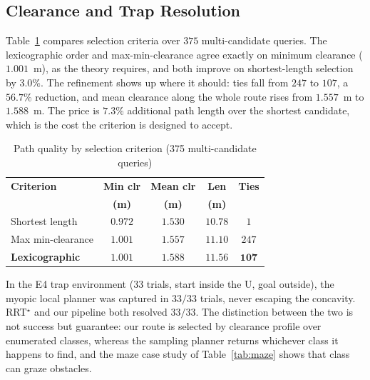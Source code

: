 \documentclass[conference]{IEEEtran}
\begin{document}
\subsection{Clearance and Trap Resolution}
Table~\ref{tab:clearance} compares selection criteria over $375$ multi-candidate queries. The lexicographic order and max-min-clearance agree exactly on minimum clearance ($1.001$~m), as the theory requires, and both improve on shortest-length selection by $3.0\%$. The refinement shows up where it should: ties fall from $247$ to $107$, a $56.7\%$ reduction, and mean clearance along the whole route rises from $1.557$~m to $1.588$~m. The price is $7.3\%$ additional path length over the shortest candidate, which is the cost the criterion is designed to accept.
\begin{table}[htbp]
\caption{Path quality by selection criterion (375 multi-candidate queries)}
\label{tab:clearance}
\begin{center}
\begin{tabular}{@{}lcccc@{}}
\toprule
\textbf{Criterion} & \textbf{Min clr} & \textbf{Mean clr} & \textbf{Len} & \textbf{Ties} \\
 & \textbf{(m)} & \textbf{(m)} & \textbf{(m)} & \\ \midrule
Shortest length & $0.972$ & $1.530$ & $\mathbf{10.78}$ & $1$ \\
Max min-clearance & $\mathbf{1.001}$ & $1.557$ & $11.10$ & $247$ \\
\textbf{Lexicographic} & $\mathbf{1.001}$ & $\mathbf{1.588}$ & $11.56$ & $\mathbf{107}$ \\ \bottomrule
\end{tabular}
\end{center}
\end{table}
In the E4 trap environment ($33$ trials, start inside the U, goal outside), the myopic local planner was captured in $33/33$ trials, never escaping the concavity. RRT$^\star$ and our pipeline both resolved $33/33$. The distinction between the two is not success but guarantee: our route is selected by clearance profile over enumerated classes, whereas the sampling planner returns whichever class it happens to find, and the maze case study of Table~\ref{tab:maze} shows that class can graze obstacles.
\end{document}
